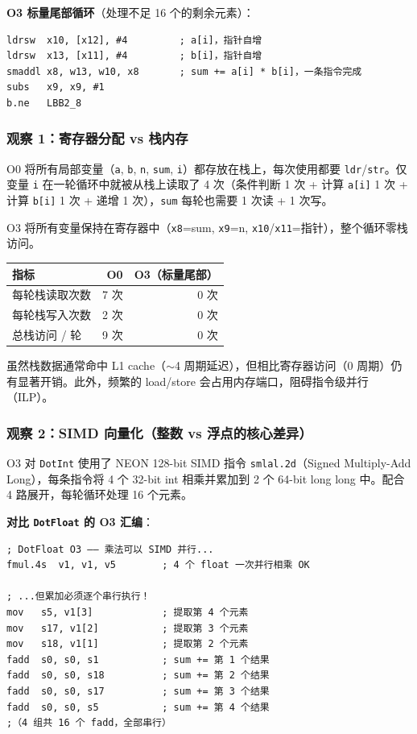 \documentclass[12pt,a4paper]{article}
\begin{document}
\textbf{O3 标量尾部循环}（处理不足 16 个的剩余元素）：

\begin{lstlisting}
ldrsw  x10, [x12], #4         ; a[i]，指针自增
ldrsw  x13, [x11], #4         ; b[i]，指针自增
smaddl x8, w13, w10, x8       ; sum += a[i] * b[i]，一条指令完成
subs   x9, x9, #1
b.ne   LBB2_8
\end{lstlisting}

\subsubsection{观察 1：寄存器分配 vs 栈内存}

O0 将所有局部变量（\texttt{a}, \texttt{b}, \texttt{n}, \texttt{sum}, \texttt{i}）都存放在栈上，每次使用都要 \texttt{ldr}/\texttt{str}。仅变量 \texttt{i} 在一轮循环中就被从栈上读取了 4 次（条件判断 1 次 + 计算 \texttt{a[i]} 1 次 + 计算 \texttt{b[i]} 1 次 + 递增 1 次），\texttt{sum} 每轮也需要 1 次读 + 1 次写。

O3 将所有变量保持在寄存器中（\texttt{x8}=sum, \texttt{x9}=n, \texttt{x10}/\texttt{x11}=指针），整个循环零栈访问。

\begin{table}[H]
\centering
\begin{tabular}{l r r}
\toprule
指标 & O0 & O3（标量尾部） \\
\midrule
每轮栈读取次数 & 7 次 & 0 次 \\
每轮栈写入次数 & 2 次 & 0 次 \\
总栈访问 / 轮 & 9 次 & 0 次 \\
\bottomrule
\end{tabular}
\end{table}

虽然栈数据通常命中 L1 cache（$\sim$4 周期延迟），但相比寄存器访问（0 周期）仍有显著开销。此外，频繁的 load/store 会占用内存端口，阻碍指令级并行（ILP）。

\subsubsection{观察 2：SIMD 向量化（整数 vs 浮点的核心差异）}

O3 对 \texttt{DotInt} 使用了 NEON 128-bit SIMD 指令 \texttt{smlal.2d}（Signed Multiply-Add Long），每条指令将 4 个 32-bit int 相乘并累加到 2 个 64-bit long long 中。配合 4 路展开，每轮循环处理 16 个元素。

\textbf{对比 \texttt{DotFloat} 的 O3 汇编}：

\begin{lstlisting}
; DotFloat O3 —— 乘法可以 SIMD 并行...
fmul.4s  v1, v1, v5        ; 4 个 float 一次并行相乘 OK

; ...但累加必须逐个串行执行！
mov   s5, v1[3]            ; 提取第 4 个元素
mov   s17, v1[2]           ; 提取第 3 个元素
mov   s18, v1[1]           ; 提取第 2 个元素
fadd  s0, s0, s1           ; sum += 第 1 个结果
fadd  s0, s0, s18          ; sum += 第 2 个结果
fadd  s0, s0, s17          ; sum += 第 3 个结果
fadd  s0, s0, s5           ; sum += 第 4 个结果
;（4 组共 16 个 fadd，全部串行）
\end{lstlisting}
\end{document}
